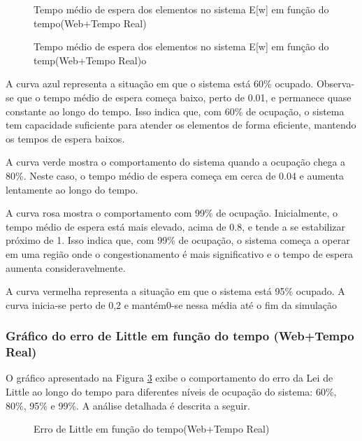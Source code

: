 \begin{figure}[h!]
   \centering
   
   \caption{Tempo médio de espera dos elementos no sistema E[w] em função do tempo(Web+Tempo Real)}
   \label{fig:eWE2Web}
\end{figure}

\begin{figure}[h!]
   \centering
   
   \caption{Tempo médio de espera dos elementos no sistema E[w] em função do temp(Web+Tempo Real)o}
   \label{fig:eWE2Web2}
\end{figure}

A curva azul representa a situação em que o sistema está 60\% ocupado. Observa-se que o tempo médio de espera começa baixo, perto de 0.01, e permanece quase constante ao longo do tempo. Isso indica que, com 60\% de ocupação, o sistema tem capacidade suficiente para atender os elementos de forma eficiente, mantendo os tempos de espera baixos.

A curva verde mostra o comportamento do sistema quando a ocupação chega a 80\%. Neste caso, o tempo médio de espera começa em cerca de 0.04 e aumenta lentamente ao longo do tempo.

A curva rosa mostra o comportamento com 99\% de ocupação. Inicialmente, o tempo médio de espera está mais elevado, acima de 0.8, e tende a se estabilizar próximo de 1. Isso indica que, com 99\% de ocupação, o sistema começa a operar em uma região onde o congestionamento é mais significativo e o tempo de espera aumenta consideravelmente.

A curva vermelha representa a situação em que o sistema está 95\% ocupado. A curva inicia-se perto de 0,2 e mantém0-se nessa média até o fim da simulação


\subsubsection{Gráfico do erro de Little em função do tempo (Web+Tempo Real)}
O gráfico apresentado na Figura \ref{fig:littleE2Web} exibe o comportamento do erro da Lei de Little ao longo do tempo para diferentes níveis de ocupação do sistema: 60\%, 80\%, 95\% e 99\%. A análise detalhada é descrita a seguir.

\begin{figure}[h!]
   \centering
   
   \caption{Erro de Little em função do tempo(Web+Tempo Real)}
   \label{fig:littleE2Web}
\end{figure}

